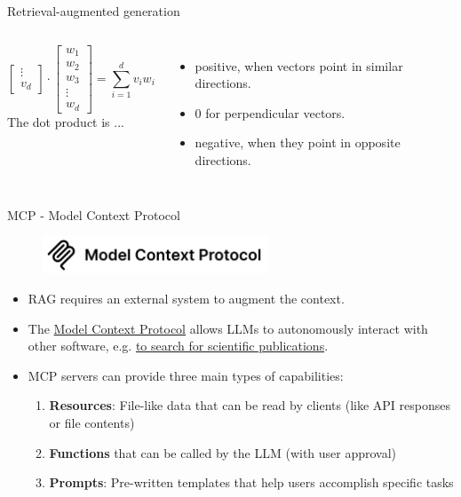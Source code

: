\documentclass[10pt]{beamer}
\newcommand{\feature}[1]{{\color{scLime} \textbf{#1}}}
\begin{document}
\begin{frame}{Retrieval-augmented generation}
\begin{columns}[T,onlytextwidth]
$$\begin{bmatrix}
			\vdots \\
			v_d
		\end{bmatrix}
		\cdot
		\begin{bmatrix}
			w_1 \\
			w_2 \\
			w_3 \\
			\vdots \\
			w_d
		\end{bmatrix}
	    = \sum_{i=1}^{d} v_i w_i
		$$
		\vspace{0.1cm}
		The dot product is ...
				\begin{itemize}
			\item positive, when vectors point in similar directions. 
			\item 0 for perpendicular vectors.
			\item negative, when they point in opposite directions.
		\end{itemize}
	\end{columns}
\end{frame}


\begin{frame}{MCP - Model Context Protocol}
	\begin{figure}
		\includegraphics[width=0.6\textwidth]{figures/ModelContextProtocol.png}
	\end{figure}
	\begin{itemize}
		\item RAG requires an external system to augment the context.
		\item The \href{https://modelcontextprotocol.io/introduction}{Model Context Protocol} allows LLMs to autonomously interact with other software, e.g. \href{https://github.com/grll/pubmedmcp}{to search for scientific publications}.
		\item MCP servers can provide three main types of capabilities:
		\begin{enumerate}
			\item \feature{Resources}: File-like data that can be read by clients (like API responses or file contents)
			\item  \feature{Functions} that can be called by the LLM (with user approval)
			\item \feature{Prompts}: Pre-written templates that help users accomplish specific tasks
		\end{enumerate}
\end{itemize}
\end{frame}
\end{document}
